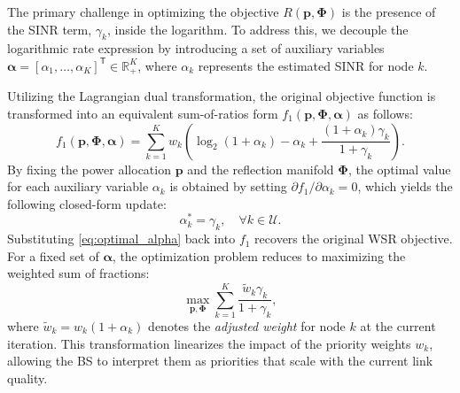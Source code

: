 \documentclass[journal]{IEEEtran}
\newcommand{\trans}{^{\mathsf{T}}}
\begin{document}
The primary challenge in optimizing the objective $R(\mathbf{p}, \boldsymbol{\Phi})$ is the presence of the SINR term, $\gamma_k$, inside the logarithm. To address this, we decouple the logarithmic rate expression by introducing a set of auxiliary variables $\boldsymbol{\alpha} = [\alpha_1, \dots, \alpha_K]\trans \in \mathbb{R}_+^K$, where $\alpha_k$ represents the estimated SINR for node $k$. 

Utilizing the Lagrangian dual transformation, the original objective function is transformed into an equivalent sum-of-ratios form $f_1(\mathbf{p}, \boldsymbol{\Phi}, \boldsymbol{\alpha})$ as follows:
\begin{equation}
    f_1(\mathbf{p}, \boldsymbol{\Phi}, \boldsymbol{\alpha}) = \sum_{k=1}^K w_k \left( \log_2(1 + \alpha_k) - \alpha_k + \frac{(1 + \alpha_k) \gamma_k}{1 + \gamma_k} \right).
\end{equation}
By fixing the power allocation $\mathbf{p}$ and the reflection manifold $\boldsymbol{\Phi}$, the optimal value for each auxiliary variable $\alpha_k$ is obtained by setting $\partial f_1 / \partial \alpha_k = 0$, which yields the following closed-form update:
\begin{equation}
    \alpha_k^* = \gamma_k, \quad \forall k \in \mathcal{U}.
    \label{eq:optimal_alpha}
\end{equation}
Substituting \eqref{eq:optimal_alpha} back into $f_1$ recovers the original WSR objective. For a fixed set of $\boldsymbol{\alpha}$, the optimization problem reduces to maximizing the weighted sum of fractions:
\begin{equation}
    \max_{\mathbf{p}, \boldsymbol{\Phi}} \sum_{k=1}^K \frac{\tilde{w}_k \gamma_k}{1 + \gamma_k},
\end{equation}
where $\tilde{w}_k = w_k (1 + \alpha_k)$ denotes the \textit{adjusted weight} for node $k$ at the current iteration. This transformation linearizes the impact of the priority weights $w_k$, allowing the BS to interpret them as  priorities that scale with the current link quality.

\end{document}
